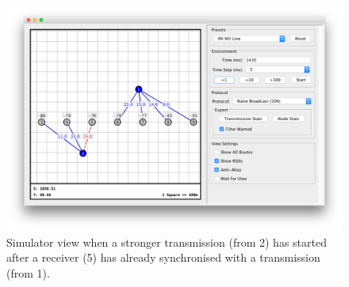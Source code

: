 \begin{figure}[H]
    \centering
   	\includegraphics[width=\textwidth]{Figures/simulator_interference}
    \caption[Simulator view with interference]{
    	Simulator view when a stronger transmission (from 2) has started after a receiver (5) has already synchronised with a transmission (from 1).
    }
\end{figure}

